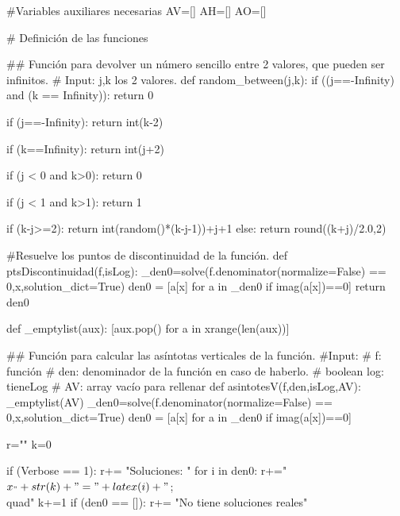 \newcommand{\mygrafo}{
\paragraph{Gráfica de la función}
\ifverbose
En azul se marcan las asíntotas verticales, en rojo las horizontales y en morado las oblícuas.
\fi
\begin{center}
\sageplot{_myplot(f,AH=uniq(AH),AV=uniq(AV),AO=AO)}
\end{center}
}




\begin{sagesilent}

#Variables auxiliares necesarias
AV=[]
AH=[]
AO=[]

# Definición de las funciones

## Función para devolver un número sencillo entre 2 valores, que pueden ser infinitos.
# Input: j,k los 2 valores.
def random_between(j,k):
 if ((j==-Infinity) and (k == Infinity)):
  return 0

 if (j==-Infinity):
  return int(k-2)

 if (k==Infinity):
  return int(j+2)

 if (j < 0 and k>0):
  return 0

 if (j < 1 and k>1):
  return 1


 if (k-j>=2):
  return int(random()*(k-j-1))+j+1
 else:
  return round((k+j)/2.0,2)

#Resuelve los puntos de discontinuidad de la función.
def ptsDiscontinuidad(f,isLog):
    _den0=solve(f.denominator(normalize=False) == 0,x,solution_dict=True)
    den0 = [a[x] for a in _den0 if imag(a[x])==0]
    return den0

def _emptylist(aux):
    [aux.pop() for a in xrange(len(aux))]
    
## Función para calcular las asíntotas verticales de la función.
#Input:
# f: función
# den: denominador de la función en caso de haberlo.
# boolean log: tieneLog 
# AV: array vacío para rellenar
def asintotesV(f,den,isLog,AV):
    _emptylist(AV)
    _den0=solve(f.denominator(normalize=False) == 0,x,solution_dict=True)
    den0 = [a[x] for a in _den0 if imag(a[x])==0]

    r=""
    k=0

    if (Verbose == 1):
        r+= "Soluciones: "
        for i in den0:
            r+="$x_"+str(k)+"="+latex(i)+" $;\\quad"
            k+=1
        if (den0 == []):
            r+= "No tiene soluciones reales"


\end{sagesilent}
